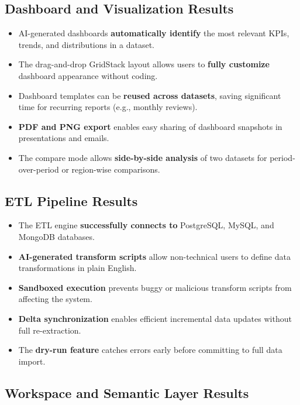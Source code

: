 \documentclass[12pt,a4paper]{report}
\begin{document}
\subsection{Dashboard and Visualization Results}

\begin{itemize}[leftmargin=1.5cm]
    \item AI-generated dashboards \textbf{automatically identify} the most relevant KPIs, trends, and distributions in a dataset.
    \item The drag-and-drop GridStack layout allows users to \textbf{fully customize} dashboard appearance without coding.
    \item Dashboard templates can be \textbf{reused across datasets}, saving significant time for recurring reports (e.g., monthly reviews).
    \item \textbf{PDF and PNG export} enables easy sharing of dashboard snapshots in presentations and emails.
    \item The compare mode allows \textbf{side-by-side analysis} of two datasets for period-over-period or region-wise comparisons.
\end{itemize}

\subsection{ETL Pipeline Results}

\begin{itemize}[leftmargin=1.5cm]
    \item The ETL engine \textbf{successfully connects to} PostgreSQL, MySQL, and MongoDB databases.
    \item \textbf{AI-generated transform scripts} allow non-technical users to define data transformations in plain English.
    \item \textbf{Sandboxed execution} prevents buggy or malicious transform scripts from affecting the system.
    \item \textbf{Delta synchronization} enables efficient incremental data updates without full re-extraction.
    \item The \textbf{dry-run feature} catches errors early before committing to full data import.
\end{itemize}

\subsection{Workspace and Semantic Layer Results}
\end{document}
